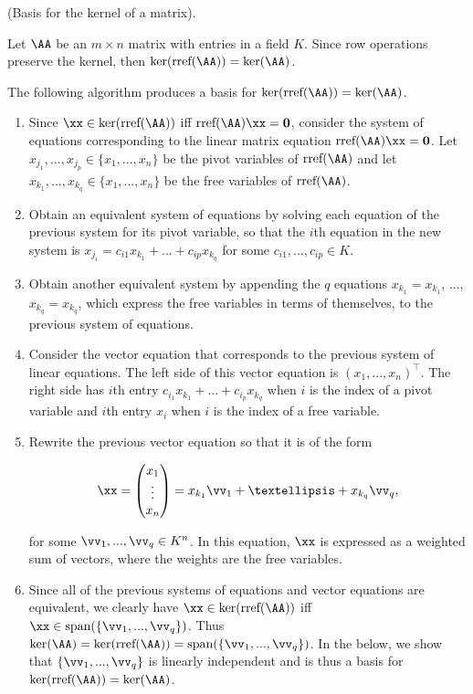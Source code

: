 \begin{theorem}
    (Basis for the kernel of a matrix).
    
    Let $\AA$ be an $m \times n$ matrix with entries in a field $K$. Since row operations preserve the kernel, then $\ker(\rref(\AA)) = \ker(\AA)$.
    
    The following algorithm produces a basis for $\ker(\rref(\AA)) = \ker(\AA)$.

    \begin{enumerate}
        \item Since $\xx \in \ker(\rref(\AA))$ iff $\rref(\AA) \xx = \mathbf{0}$, consider the system of equations corresponding to the linear matrix equation $\rref(\AA) \xx = \mathbf{0}$. Let $x_{j_1}, ..., x_{j_p} \in \{x_1, ..., x_n\}$ be the pivot variables of $\rref(\AA)$ and let $x_{k_1}, ..., x_{k_q} \in \{x_1, ..., x_n\}$ be the free variables of $\rref(\AA)$. 
        \item Obtain an equivalent system of equations by solving each equation of the previous system for its pivot variable, so that the $i$th equation in the new system is $x_{j_i} = c_{i1} x_{k_1} + ... + c_{ip} x_{k_q}$ for some $c_{i1}, ..., c_{ip} \in K$.
        \item Obtain another equivalent system by appending the $q$ equations $x_{k_1} = x_{k_1}$, ..., $x_{k_q} = x_{k_q}$, which express the free variables in terms of themselves, to the previous system of equations.
        \item Consider the vector equation that corresponds to the previous system of linear equations. The left side of this vector equation is $(x_1, ..., x_n)^\top$. The right side has $i$th entry $c_{i_1} x_{k_1} + ... + c_{i_p} x_{k_q}$ when $i$ is the index of a pivot variable and $i$th entry $x_i$ when $i$ is the index of a free variable.
        \item Rewrite the previous vector equation so that it is of the form

        \begin{align*}
            \xx =
            \begin{pmatrix}
                x_1 \\ \vdots \\ x_n
            \end{pmatrix}
            = 
            x_{k_1} \vv_1 + … + x_{k_q} \vv_q,
        \end{align*}

        for some $\vv_1, ..., \vv_q \in K^n$. In this equation, $\xx$ is expressed as a weighted sum of vectors, where the weights are the free variables.

        \item Since all of the previous systems of equations and vector equations are equivalent, we clearly have ${\xx \in \ker(\rref(\AA))}$ iff $\xx \in \spann(\{\vv_1, ..., \vv_q\})$. Thus $\ker(\AA) = \ker(\rref(\AA)) = \spann(\{\vv_1, ..., \vv_q\})$. 
        In the below, we show that $\{\vv_1, ..., \vv_q\}$ is linearly independent and is thus a basis for $\ker(\rref(\AA)) = \ker(\AA)$.
    \end{enumerate}
\end{theorem}


